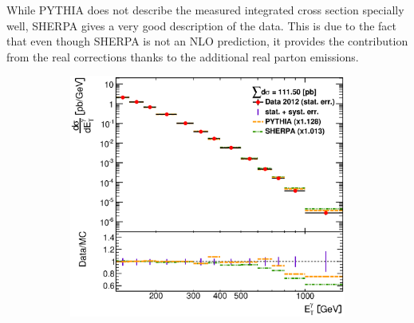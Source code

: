 \documentclass[12pt, twoside]{article}
\numberwithin{equation}{section}
\numberwithin{figure}{section}
\newenvironment{changemargin}[2]{%
\begin{list}{}{%
\setlength{\topsep}{0pt}%
\setlength{\leftmargin}{#1}%
\setlength{\rightmargin}{#2}%
\setlength{\listparindent}{\parindent}%
\setlength{\itemindent}{\parindent}%
\setlength{\parsep}{\parskip}%
}%
\item[]}{\end{list}}
\begin{document}
While PYTHIA does not describe the measured integrated cross section specially well, SHERPA gives a very good description of the data. This is due to the fact that even though SHERPA is not an NLO prediction, it provides the contribution from the real corrections thanks to the additional real parton emissions.

\begin{figure}
    \centering
    \checkoddpage
    \ifoddpage
        \begin{changemargin}{-1.0cm}{-0.75cm}
    \else
        \begin{changemargin}{-0.75cm}{-1.0cm}
    \fi
        \begin{subfigure}[b]{0.37\textwidth}
            \includegraphics[width=\textwidth]{./images/DifferentialCrossSections/DIFF_CRSS_SEC-101.eps}
            \subcaption{}
            \label{fig:DiffCrossSectEtPhoton}
        \end{subfigure}
        \begin{subfigure}[b]{0.37\textwidth}

\end{subfigure}
\end{changemargin}
\end{changemargin}
\end{figure}
\end{document}

